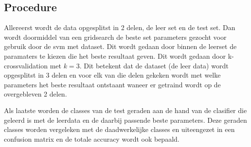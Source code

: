 \documentclass{article}
\begin{document}
\subsection{Procedure}
Allereerst wordt de data opgesplitst in 2 delen, de leer set en de test set.
Dan wordt doormiddel van een gridsearch de beste set parameters gezocht voor
gebruik door de svm met dataset. Dit wordt gedaan door binnen de leerset de
paramaters te kiezen die het beste resultaat geven. Dit wordt gedaan door
k-crossvalidation met $k=3$. Dit betekent dat de dataset (de leer data) wordt
opgesplitst in 3 delen en voor elk van die delen gekeken wordt met welke
parameters het beste resultaat ontstaant waneer er getraind wordt op de
overgebleven 2 delen.

Als laatste worden de classes van de test geraden aan de hand van de clasifier
die geleerd is met de leerdata en de daarbij passende beste parameters. Deze
geraden classes worden vergeleken met de daadwerkelijke classes en uiteengezet
in een confusion matrix en de totale accuracy wordt ook bepaald.
\end{document}
